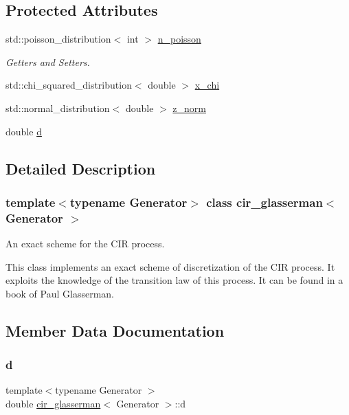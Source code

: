 \subsection*{Protected Attributes}
\begin{DoxyCompactItemize}
\item 
std\+::poisson\+\_\+distribution$<$ int $>$ \mbox{\hyperlink{classcir__glasserman_aed2bd8f09e275a2fd0012989771c61f7}{n\+\_\+poisson}}
\begin{DoxyCompactList}\small\item\em Getters and Setters. \end{DoxyCompactList}\item 
std\+::chi\+\_\+squared\+\_\+distribution$<$ double $>$ \mbox{\hyperlink{classcir__glasserman_a1f91410b367839c4b81e8e89e9597848}{x\+\_\+chi}}
\item 
std\+::normal\+\_\+distribution$<$ double $>$ \mbox{\hyperlink{classcir__glasserman_ab16c1db0bb521957833f67c690b6b8a4}{z\+\_\+norm}}
\item 
double \mbox{\hyperlink{classcir__glasserman_ad43d0610db68017bf054096cda60b27e}{d}}
\end{DoxyCompactItemize}


\subsection{Detailed Description}
\subsubsection*{template$<$typename Generator$>$\newline
class cir\+\_\+glasserman$<$ Generator $>$}

An exact scheme for the C\+IR process. 

This class implements an exact scheme of discretization of the C\+IR process. It exploits the knowledge of the transition law of this process. It can be found in a book of Paul Glasserman. 

\subsection{Member Data Documentation}
\mbox{\label{classcir__glasserman_ad43d0610db68017bf054096cda60b27e}} 
\subsubsection{\texorpdfstring{d}{d}}
{\footnotesize\ttfamily template$<$typename Generator $>$ \\
double \mbox{\hyperlink{classcir__glasserman}{cir\+\_\+glasserman}}$<$ Generator $>$\+::d\hspace{0.3cm}{\ttfamily [protected]}}

